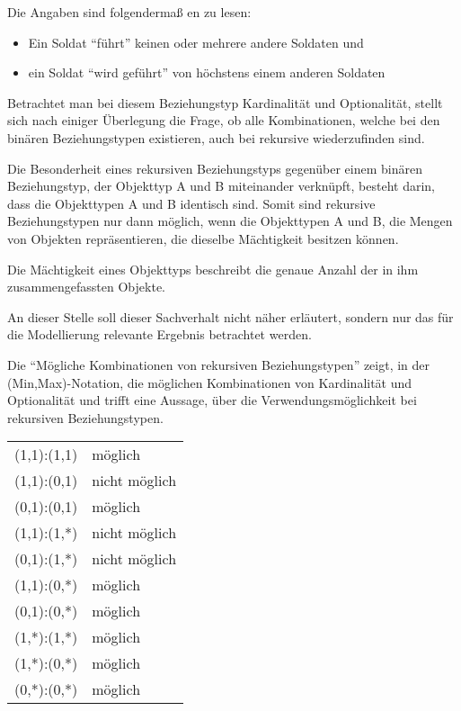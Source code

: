         Die Angaben sind folgendermaß en zu lesen:
        \begin{itemize}
          \item Ein Soldat \enquote{führt} keinen oder mehrere andere Soldaten und
          \item ein Soldat \enquote{wird geführt} von höchstens einem anderen Soldaten
        \end{itemize}
        Betrachtet man bei diesem Beziehungstyp Kardinalität und Optionalität, stellt sich nach einiger Überlegung die Frage, ob alle Kombinationen, welche bei den binären Beziehungstypen existieren, auch bei rekursive wiederzufinden sind.

        Die Besonderheit eines rekursiven Beziehungstyps gegenüber einem binären Beziehungstyp, der Objekttyp A und B miteinander verknüpft, besteht darin, dass die Objekttypen A und B identisch sind. Somit sind rekursive Beziehungstypen nur dann möglich, wenn die Objekttypen A und B, die Mengen von Objekten repräsentieren, die dieselbe Mächtigkeit besitzen können.
        \begin{merke}
          Die Mächtigkeit eines Objekttyps beschreibt die genaue Anzahl der in ihm zusammengefassten Objekte.
        \end{merke}
        An dieser Stelle soll dieser Sachverhalt nicht näher erläutert, sondern nur das für die Modellierung relevante Ergebnis betrachtet werden.

        Die  \enquote{Mögliche Kombinationen von rekursiven Beziehungstypen} zeigt, in der\\ (Min,Max)-Notation, die möglichen Kombinationen von Kardinalität und Optionalität und trifft eine Aussage, über die Verwendungsmöglichkeit bei rekursiven Beziehungstypen.

        \label{combinationsrecurisverelationtyps}
        \begin{supertabular}[h]{lp{5cm}}
          (1,1):(1,1) & möglich\\
          (1,1):(0,1) & nicht möglich\\
          (0,1):(0,1) & möglich\\
          (1,1):(1,*) & nicht möglich\\
          (0,1):(1,*) & nicht möglich\\
          (1,1):(0,*) & möglich\\
          (0,1):(0,*) & möglich\\
          (1,*):(1,*) & möglich\\
          (1,*):(0,*) & möglich\\
          (0,*):(0,*) & möglich\\
        \end{supertabular}

